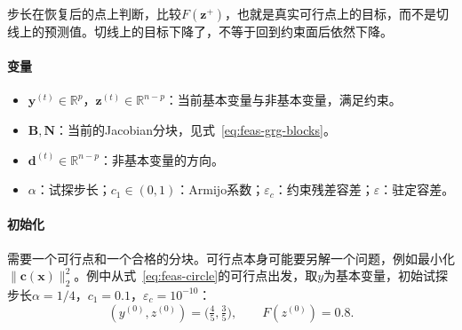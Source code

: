 步长在恢复后的点上判断，比较$F(\bm{z}^{+})$，也就是真实可行点上的目标，而不是切线上的预测值。切线上的目标下降了，不等于回到约束面后依然下降。

\paragraph{变量}
\begin{itemize}
 \item $\bm{y}^{(t)}\in\mathbb{R}^p$，$\bm{z}^{(t)}\in\mathbb{R}^{n-p}$：当前基本变量与非基本变量，满足约束。
 \item $\bm{B},\bm{N}$：当前的Jacobian分块，见式~\eqref{eq:feas-grg-blocks}。
 \item $\bm{d}^{(t)}\in\mathbb{R}^{n-p}$：非基本变量的方向。
 \item $\alpha$：试探步长；$c_1\in(0,1)$：Armijo系数；$\varepsilon_c$：约束残差容差；$\varepsilon$：驻定容差。
\end{itemize}

\paragraph{初始化}
需要一个可行点和一个合格的分块。可行点本身可能要另解一个问题，例如最小化$\lVert\bm{c}(\bm{x})\rVert_2^2$。例中从式~\eqref{eq:feas-circle}的可行点出发，取$y$为基本变量，初始试探步长$\alpha=1/4$，$c_1=0.1$，$\varepsilon_c=10^{-10}$：
\[
 (y^{(0)},z^{(0)})=\bigl(\tfrac45,\tfrac35\bigr),\qquad F(z^{(0)})=0.8.
\]


